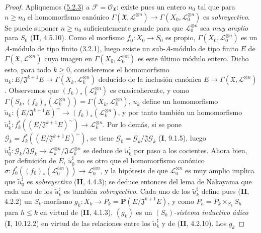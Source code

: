 \begin{proof}
Apliquemos (\hyperref[III.5.2.3-fr]{5.2.3}) a
$\mathcal F=\mathcal O_{\mathfrak X}$: existe pues un entero $n_0$ tal que
para $n\geq n_0$ el homomorfismo canónico
$\Gamma(\mathfrak X,\mathcal L^{\otimes n})\to
\Gamma(X_0,\mathcal L_0^{\otimes n})$ es \emph{sobreyectivo}. Se puede suponer
$n\geq n_0$ suficientemente grande para que $\mathcal L_0^{\otimes n}$ sea \emph{muy
amplio} para $S_0$ (\textbf{II}, 4.5.10). Como el morfismo $f_0:X_0\to S_0$ es propio,
$\Gamma(X_0,\mathcal L_0^{\otimes n})$ es un $A$-módulo de tipo finito (3.2.1),
luego existe un sub-$A$-módulo de tipo finito $E$ de
$\Gamma(\mathfrak X,\mathcal L^{\otimes n})$ cuya imagen en
$\Gamma(X_0,\mathcal L_0^{\otimes n})$ es este último módulo entero.
Dicho esto, para todo $k\geq0$, consideremos el homomorfismo
$u_k:E/\mathfrak J^{k+1}E\longrightarrow
\Gamma(X_k,\mathcal L_k^{\otimes n})$
deducido de la inclusión canónica
$E\to\Gamma(\mathfrak X,\mathcal L^{\otimes n})$. Observemos que
$(f_k)_*(\mathcal L_k^{\otimes n})$ es cuasicoherente, y como
$\Gamma(S_k,(f_k)_*(\mathcal L_k^{\otimes n}))
=\Gamma(X_k,\mathcal L_k^{\otimes n})$, $u_k$ define un homomorfismo
$\widetilde u_k:(E/\mathfrak J^{k+1}E)^\sim
\longrightarrow(f_k)_*(\mathcal L_k^{\otimes n})$,
y por tanto también un homomorfismo
$\widetilde u_k^\sharp:
f_k^*((E/\mathfrak J^{k+1}E)^\sim)\longrightarrow
\mathcal L_k^{\otimes n}$.
Por lo demás, si se pone
$\mathcal G_k=f_k^*((E/\mathfrak J^{k+1}E)^\sim)$, se tiene
$\mathcal G_0=\mathcal G_k/\mathfrak J\mathcal G_k$ (\textbf{I}, 9.1.5), luego
$\widetilde u_0^\sharp:\mathcal G_k/\mathfrak J\mathcal G_k
\to\mathcal L_k^{\otimes n}/\mathfrak J\mathcal L_k^{\otimes n}$ se deduce
de $\widetilde u_k^\sharp$ por paso a los cocientes. Ahora bien, por definición de
$E$, $\widetilde u_0^\sharp$ no es otro que el homomorfismo canónico
$\sigma:f_0^*((f_0)_*(\mathcal L_0^{\otimes n}))\longrightarrow
\mathcal L_0^{\otimes n}$,
y la hipótesis de que $\mathcal L_0^{\otimes n}$ es muy amplio implica que
$\widetilde u_0^\sharp$ es \emph{sobreyectivo} (\textbf{II}, 4.4.3); se deduce entonces del lema
de Nakayama que cada uno de los $\widetilde u_k^\sharp$ es también \emph{sobreyectivo}.
Cada uno de los $\widetilde u_k^\sharp$ define pues (\textbf{II}, 4.2.2) un
$S_k$-morfismo
$g_k:X_k\longrightarrow P_k=\mathbf P(E/\mathfrak J^{k+1}E)$,
y como $P_h=P_k\times_{S_k}S_h$ para $h\leq k$ en virtud de (\textbf{II}, 4.1.3),
$(g_k)$ es un $(S_k)$-\emph{sistema inductivo ádico} (\textbf{I}, 10.12.2) en virtud de las
relaciones entre los $\widetilde u_k^\sharp$ y de (\textbf{II}, 4.2.10). Los $g_k$

\end{proof}
